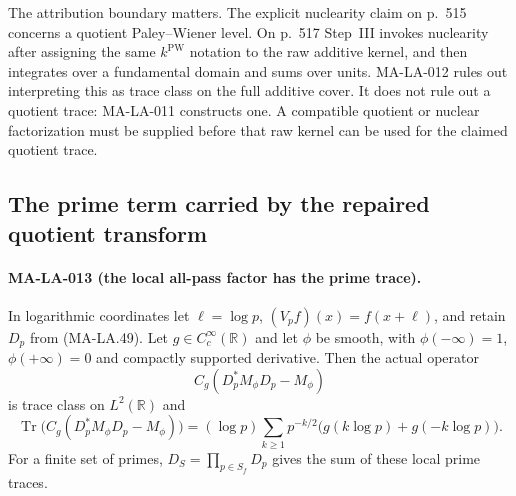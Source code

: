 The attribution boundary matters.  The explicit nuclearity
claim on p.~515 concerns a quotient Paley--Wiener level.
On p.~517 Step~III invokes nuclearity after assigning the same
$k^{\mathrm{PW}}$ notation to the raw additive kernel, and
then integrates over a fundamental domain and sums over units.
MA-LA-012 rules out interpreting this as trace class on the
full additive cover.  It does not rule out a quotient trace:
MA-LA-011 constructs one.  A compatible quotient or nuclear
factorization must be supplied before that raw kernel can
be used for the claimed quotient trace.

\subsection{The prime term carried by the repaired quotient transform}

\paragraph{MA-LA-013 (the local all-pass factor has the prime trace).}
In logarithmic coordinates let $\ell=\log p$,
$(V_pf)(x)=f(x+\ell)$, and retain $D_p$ from (MA-LA.49).
Let $g\in C_c^\infty(\mathbb R)$ and let $\phi$ be smooth,
with $\phi(-\infty)=1$, $\phi(+\infty)=0$ and compactly
supported derivative.  Then the actual operator
\[
                  C_g(D_p^*M_\phi D_p-M_\phi)
 \tag{MA-LA.59}
\]
is trace class on $L^2(\mathbb R)$ and
\[
 \operatorname{Tr}\bigl(C_g(D_p^*M_\phi D_p-M_\phi)\bigr)
      = (\log p)\sum_{k\ge1}p^{-k/2}
                    \bigl(g(k\log p)+g(-k\log p)\bigr).
 \tag{MA-LA.60}
\]
For a finite set of primes, $D_S=\prod_{p\in S_f}D_p$
gives the sum of these local prime traces.

